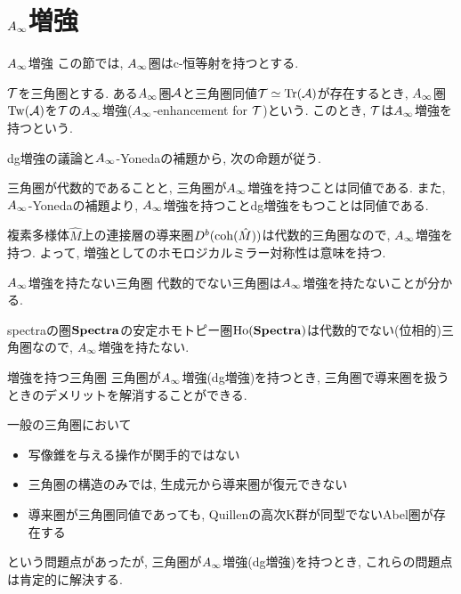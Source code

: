 \documentclass[aspectratio=169, dvipdfmx, 8pt, notheorems, uplatex]{beamer}
\begin{document}
\section{$\Ainf$増強}

\begin{frame}{$\Ainf$増強}
  この節では, $\Ainf$圏はc-恒等射を持つとする.

  \begin{definition}[$\Ainf$増強]
    $\mathcal{T}$を三角圏とする. 
    ある$\Ainf$圏$\mathcal{A}$と三角圏同値$\mathcal{T} \simeq \mathrm{Tr}(\mathcal{A})$が存在するとき, $\Ainf$圏$\mathrm{Tw}(\mathcal{A})$を$\mathcal{T}$の$\Ainf$増強($\Ainf$-enhancement for $\mathcal{T}$)という.
    このとき, $\mathcal{T}$は$\Ainf$増強を持つという. 
  \end{definition} 

  dg増強の議論と$\Ainf$-Yonedaの補題から, 次の命題が従う. 

  \begin{theorem}
    三角圏が代数的であることと, 三角圏が$\Ainf$増強を持つことは同値である. 
    また, $\Ainf$-Yonedaの補題より, $\Ainf$増強を持つことdg増強をもつことは同値である. 
  \end{theorem}

  \begin{remark}
    複素多様体$\hat{M}$上の連接層の導来圏$D^b(\mathrm{coh}(\hat{M}))$は代数的三角圏なので, $\Ainf$増強を持つ. 
    よって, 増強としてのホモロジカルミラー対称性は意味を持つ. 
  \end{remark}
\end{frame}

\begin{frame}{$\Ainf$増強を持たない三角圏}
  代数的でない三角圏は$\Ainf$増強を持たないことが分かる. 

  \begin{example}
    spectraの圏$\mathbf{Spectra}$の安定ホモトピー圏$\mathrm{Ho}(\mathbf{Spectra})$は代数的でない(位相的)三角圏なので, $\Ainf$増強を持たない. 
  \end{example}
\end{frame}

\begin{frame}{増強を持つ三角圏}
  三角圏が$\Ainf$増強(dg増強)を持つとき, 三角圏で導来圏を扱うときのデメリットを解消することができる.
  
  \begin{block}{}
    一般の三角圏において
    \begin{itemize}
      \item 写像錐を与える操作が関手的ではない
      \item 三角圏の構造のみでは, 生成元から導来圏が復元できない
      \item 導来圏が三角圏同値であっても, Quillenの高次K群が同型でないAbel圏が存在する 
    \end{itemize}
    という問題点があったが, 三角圏が$\Ainf$増強(dg増強)を持つとき, これらの問題点は肯定的に解決する. 
  \end{block}
\end{frame}
\end{document}
